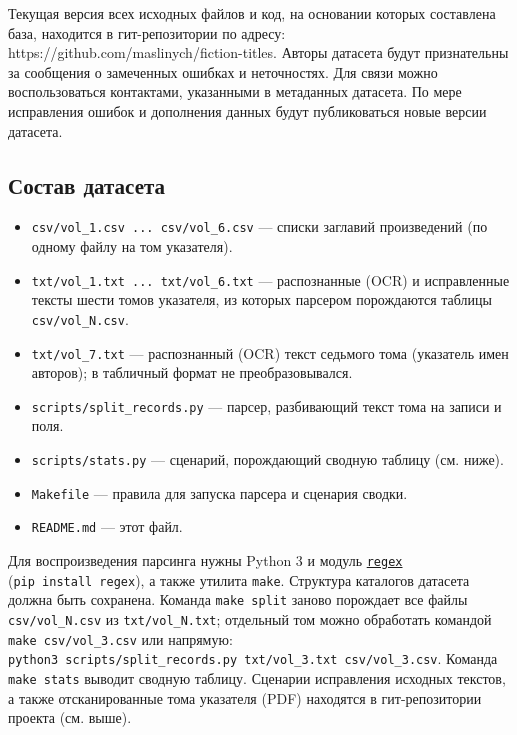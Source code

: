 \documentclass[
  russian,
]{article}
\providecommand{\tightlist}{%
  \setlength{\itemsep}{0pt}\setlength{\parskip}{0pt}}
\begin{document}
Текущая версия всех исходных файлов и код, на основании которых
составлена база, находится в гит-репозитории по адресу:
https://github.com/maslinych/fiction-titles. Авторы датасета будут
признательны за сообщения о замеченных ошибках и неточностях. Для связи
можно воспользоваться контактами, указанными в метаданных датасета. По
мере исправления ошибок и дополнения данных будут публиковаться новые
версии датасета.

\subsection{Состав
датасета}\label{ux441ux43eux441ux442ux430ux432-ux434ux430ux442ux430ux441ux435ux442ux430}

\begin{itemize}
\tightlist
\item
  \texttt{csv/vol\_1.csv\ ...\ csv/vol\_6.csv} --- списки заглавий
  произведений (по одному файлу на том указателя).
\item
  \texttt{txt/vol\_1.txt\ ...\ txt/vol\_6.txt} --- распознанные (OCR) и
  исправленные тексты шести томов указателя, из которых парсером
  порождаются таблицы \texttt{csv/vol\_N.csv}.
\item
  \texttt{txt/vol\_7.txt} --- распознанный (OCR) текст седьмого тома
  (указатель имен авторов); в табличный формат не преобразовывался.
\item
  \texttt{scripts/split\_records.py} --- парсер, разбивающий текст тома
  на записи и поля.
\item
  \texttt{scripts/stats.py} --- сценарий, порождающий сводную таблицу
  (см. ниже).
\item
  \texttt{Makefile} --- правила для запуска парсера и сценария сводки.
\item
  \texttt{README.md} --- этот файл.
\end{itemize}

Для воспроизведения парсинга нужны Python 3 и модуль
\href{https://pypi.org/project/regex/}{\texttt{regex}}
(\texttt{pip\ install\ regex}), а также утилита \texttt{make}. Структура
каталогов датасета должна быть сохранена. Команда \texttt{make\ split}
заново порождает все файлы \texttt{csv/vol\_N.csv} из
\texttt{txt/vol\_N.txt}; отдельный том можно обработать командой
\texttt{make\ csv/vol\_3.csv} или напрямую:
\texttt{python3\ scripts/split\_records.py\ txt/vol\_3.txt\ csv/vol\_3.csv}.
Команда \texttt{make\ stats} выводит сводную таблицу. Сценарии
исправления исходных текстов, а также отсканированные тома указателя
(PDF) находятся в гит-репозитории проекта (см. выше).
\end{document}
